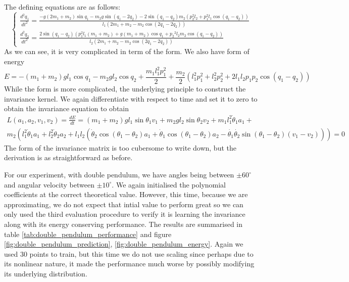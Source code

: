 \documentclass{statsmsc}
\begin{document}
The defining equations are as follows:
$$
\begin{cases}
\frac{d^2q_1}{dt^2}=\frac{-g\left(2 m_{1}+m_{2}\right) \sin q_1-m_{2} g \sin \left(q_1-2 q_2\right)-2 \sin \left(q_1-q_2\right) m_{2}\left(p_2^{2} l_{2}+p_1^{2} l_{1} \cos \left(q_1-q_2\right)\right)}{l_{1}\left(2 m_{1}+m_{2}-m_{2} \cos \left(2 q_1-2 q_2\right)\right)} \\
\frac{d^2q_2}{dt^2}=\frac{2 \sin \left(q_1-q_2\right)\left(p_1^{2} l_{1}\left(m_{1}+m_{2}\right)+g\left(m_{1}+m_{2}\right) \cos q_1+p_2{ }^{2} l_{2} m_{2} \cos \left(q_1-q_2\right)\right)}{l_{2}\left(2 m_{1}+m_{2}-m_{2} \cos \left(2 q_1-2 q_2\right)\right)}
\end{cases}
$$
As we can see, it is very complicated in term of the form.
We also have form of energy 
$$
E = -(m_1+m_2)gl_1\cos q_1-m_2gl_2\cos q_2+ \frac{m_1l^2_1p_1^2}{2}+\frac{m_2}{2}(l^2_1p_1^2+l^2_2p_2^2+2l_1l_2p_1p_2\cos(q_1-q_2))
$$
While the form is more complicated, the underlying principle to construct the invariance kernel. 
We again differentiate with respect to time and set it to zero to obtain the invariance equation to obtain 
\begin{gather*}
L(a_1, a_2, v_1, v_2)=\frac{dE}{dt} = (m_1+m_2)gl_1\sin\theta_1v_1+m_2gl_2\sin\theta_2v_2+m_1l_1^2\dot{\theta}_1a_1+\\m_2(l_1^2\dot{\theta}_1a_1+l_2^2\dot{\theta}_2a_2+l_1l_2(\dot{\theta}_2\cos(\theta_1-\theta_2)a_1+\dot{\theta}_1\cos(\theta_1-\theta_2)a_2-\dot{\theta_1}\dot{\theta_2}\sin(\theta_1-\theta_2)(v_1-v_2)))=0
\end{gather*}
The form of the invariance matrix is too cubersome to write down, but the derivation is as straightforward as before. 

For our experiment, with double pendulum, we have angles being between $\pm 60^\circ$ and angular velocity between $\pm 10^\circ$.
We again initialised the polynomial coefficients at the correct theoretical value.
However, this time, because we are approximating, we do not expect that intial value to perform great so we can only used the third evaluation procedure to verify it is learning the invariance along with its energy conserving performance.
The results are summarised in table \ref{tab:double_pendulum_performance} and figure \ref{fig:double_pendulum_prediction}, \ref{fig:double_pendulum_energy}.
Again we used 30 points to train, but this time we do not use scaling since perhaps due to its nonlinear nature, it made the performance much worse by possibly modifying its underlying distribution.
\end{document}
